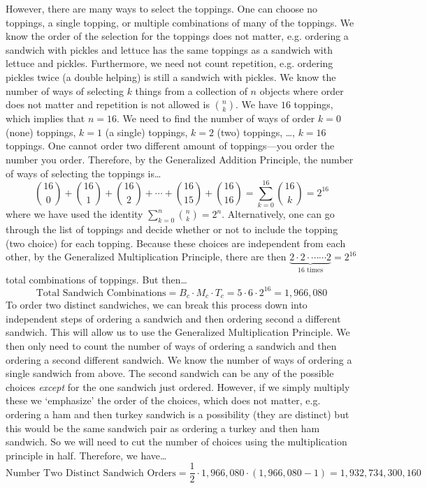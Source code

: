 \documentclass[11pt,letterpaper]{article}
\begin{document}
However, there are many ways to select the toppings. One can choose no toppings, a single topping, or multiple combinations of many of the toppings. We know the order of the selection for the toppings does not matter, e.g. ordering a sandwich with pickles and lettuce has the same toppings as a sandwich with lettuce and pickles. Furthermore, we need not count repetition, e.g. ordering pickles twice (a double helping) is still a sandwich with pickles. We know the number of ways of selecting $k$ things from a collection of $n$ objects where order does not matter and repetition is not allowed is $\binom{n}{k}$. We have $16$ toppings, which implies that $n= 16$. We need to find the number of ways of order $k= 0$ (none) toppings, $k= 1$ (a single) toppings, $k= 2$ (two) toppings, \dots, $k= 16$ toppings. One cannot order two different amount of toppings---you order the number you order. Therefore, by the Generalized Addition Principle, the number of ways of selecting the toppings is\dots
	\[
	\binom{16}{0} + \binom{16}{1} + \binom{16}{2} + \cdots + \binom{16}{15} + \binom{16}{16}= \sum_{k=0}^{16} \binom{16}{k}= 2^{16}
	\]
where we have used the identity $\sum_{k=0}^n \binom{n}{k}= 2^n$. Alternatively, one can go through the list of toppings and decide whether or not to include the topping (two choice) for each topping. Because these choices are independent from each other, by the Generalized Multiplication Principle, there are then $\underbrace{2 \cdot 2 \cdot \cdots \cdots 2}_{16 \text{ times}}= 2^{16}$ total combinations of toppings. But then\dots
	\[
	\text{Total Sandwich Combinations}= B_c \cdot M_c \cdot T_c= 5 \cdot 6 \cdot 2^{16}= 1,\!966,\!080
	\]
To order two distinct sandwiches, we can break this process down into independent steps of ordering a sandwich and then ordering second a different sandwich. This will allow us to use the Generalized Multiplication Principle. We then only need to count the number of ways of ordering a sandwich and then ordering a second different sandwich. We know the number of ways of ordering a single sandwich from above. The second sandwich can be any of the possible choices \textit{except} for the one sandwich just ordered. However, if we simply multiply these we `emphasize' the order of the choices, which does not matter, e.g. ordering a ham and then turkey sandwich is a possibility (they are distinct) but this would be the same sandwich pair as ordering a turkey and then ham sandwich. So we will need to cut the number of choices using the multiplication principle in half. Therefore, we have\dots
	\[
	\text{Number Two Distinct Sandwich Orders}= \frac{1}{2} \cdot 1,\!966,\!080 \cdot (1,\!966,\!080 - 1)= 1,\!932,\!734,\!300,\!160
	\]
\end{document}
